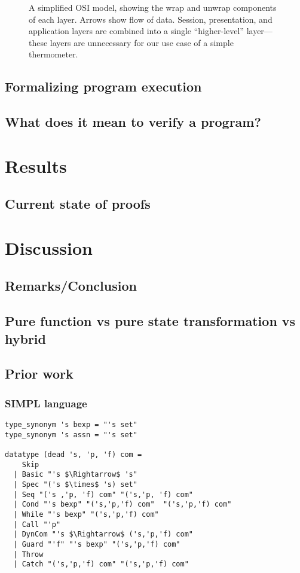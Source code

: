 \documentclass{beamer}
\begin{document}
\begin{frame}
\begin{figure}[htpb]
    
    \caption{A simplified OSI model, showing the wrap and unwrap components of each layer. Arrows show flow of data. Session, presentation, and application layers are combined into a single ``higher-level'' layer---these layers are unnecessary for our use case of a simple thermometer.}
    \label{fig:network-stack}
\end{figure}
\end{frame}

\subsection{Formalizing program execution}
\subsection{What does it mean to verify a program?}

\section{Results}
\subsection{Current state of proofs}

\section{Discussion}
\subsection{Remarks/Conclusion}
\subsection{Pure function vs pure state transformation vs hybrid}
\subsection{Prior work}




\begin{frame}[fragile]
\frametitle{SIMPL language}
\begin{lstlisting}
type_synonym 's bexp = "'s set"
type_synonym 's assn = "'s set"

datatype (dead 's, 'p, 'f) com =
    Skip
  | Basic "'s $\Rightarrow$ 's"
  | Spec "('s $\times$ 's) set"
  | Seq "('s ,'p, 'f) com" "('s,'p, 'f) com"
  | Cond "'s bexp" "('s,'p,'f) com"  "('s,'p,'f) com"
  | While "'s bexp" "('s,'p,'f) com"
  | Call "'p"
  | DynCom "'s $\Rightarrow$ ('s,'p,'f) com"
  | Guard "'f" "'s bexp" "('s,'p,'f) com"
  | Throw
  | Catch "('s,'p,'f) com" "('s,'p,'f) com"
\end{lstlisting}
\end{frame}


    
\end{document}
